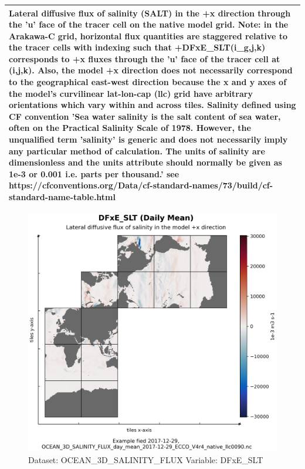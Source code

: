 \begin{longtable}{|m{}|m{}|m{}|m{}|}
\multicolumn{4}{|p{1\textwidth}|}{Lateral diffusive flux of salinity (SALT) in the +x direction through the 'u' face of the tracer cell on the native model grid. Note: in the Arakawa-C grid, horizontal flux quantities are staggered relative to the tracer cells with indexing such that +DFxE\_SLT(i\_g,j,k) corresponds to +x fluxes through the 'u' face of the tracer cell at (i,j,k). Also, the model +x direction does not necessarily correspond to the geographical east-west direction because the x and y axes of the model's curvilinear lat-lon-cap (llc) grid have arbitrary orientations which vary within and across tiles. Salinity defined using CF convention 'Sea water salinity is the salt content of sea water, often on the Practical Salinity Scale of 1978. However, the unqualified term 'salinity' is generic and does not necessarily imply any particular method of calculation. The units of salinity are dimensionless and the units attribute should normally be given as 1e-3 or 0.001 i.e. parts per thousand.' see https://cfconventions.org/Data/cf-standard-names/73/build/cf-standard-name-table.html} \\ \hline
\end{longtable}

\begin{figure}[H]
\centering
\includegraphics[scale=0.55]{../images/plots/native_plots/Ocean_Three-Dimensional_Salinity_Fluxes/DFxE_SLT.png}
\caption{Dataset: OCEAN\_3D\_SALINITY\_FLUX Variable: DFxE\_SLT}
\label{tab:table-OCEAN_3D_SALINITY_FLUX_DFxE_SLT-Plot}
\end{figure}
\pagebreak
